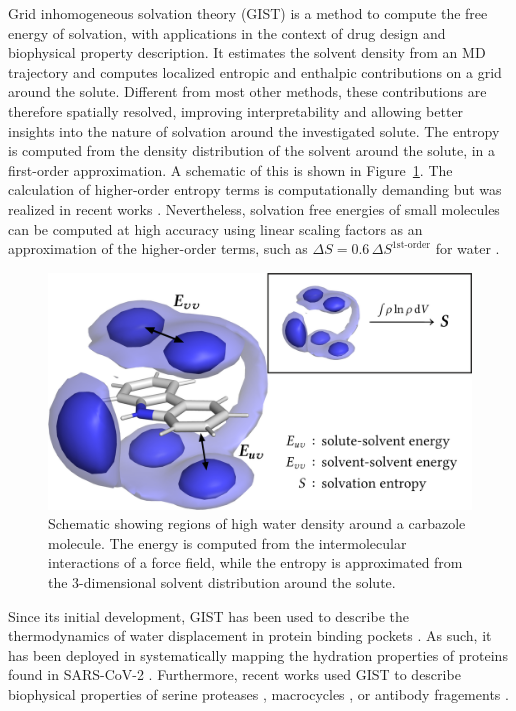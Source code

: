 \documentclass[9pt,tutorial]{livecoms}
\begin{document}
Grid inhomogeneous solvation theory (GIST) \cite{Nguyen2012} is a method to compute the free energy of solvation, with applications in the context of drug design and biophysical property description. 
It estimates the solvent density from an MD trajectory and computes localized entropic and enthalpic contributions on a grid around the solute. Different from most other methods, these contributions are therefore spatially resolved, improving interpretability and allowing better insights into the nature of solvation around the investigated solute.
The entropy is computed from the density distribution of the solvent around the solute, in a first-order approximation. A schematic of this is shown in Figure~\ref{fig:carbazole}. The calculation of higher-order entropy terms is computationally demanding but was realized in recent works \cite{Nguyen2016-gist-second-order, Waibl2021-gist-salt}. Nevertheless, solvation free energies of small molecules can be computed at high accuracy using linear scaling factors as an approximation of the higher-order terms, such as $\Delta S = 0.6\, \Delta S^\text{1st-order}$ for water \cite{Chen2021,Waibl2022-gist-solvents}.

\begin{figure}
    \centering
    \includegraphics[width=\linewidth]{figures/carbazole-figure.png}
    \caption{Schematic showing regions of high water density around a carbazole molecule. The energy is computed from the intermolecular interactions of a force field, while the entropy is approximated from the 3-dimensional solvent distribution around the solute.}
    \label{fig:carbazole}
\end{figure}

Since its initial development, GIST has been used to describe the thermodynamics of water displacement in protein binding pockets \cite{Nguyen2016-gist-second-order,Ramsey2016,Balius2017-gist-ligand-discovery,Hufner-Wulsdorf2020-gist-drug-design}.
As such, it has been deployed in systematically mapping the hydration properties of proteins found in SARS-CoV-2 \cite{Olson2020-covid-gist}.
Furthermore, recent works used GIST to describe biophysical properties of serine proteases \cite{Kraml2019-gigist}, macrocycles \cite{Kamenik2020-gist-macrocycles}, or antibody fragements \cite{Waibl2021-gist-antibodies}.
\end{document}
